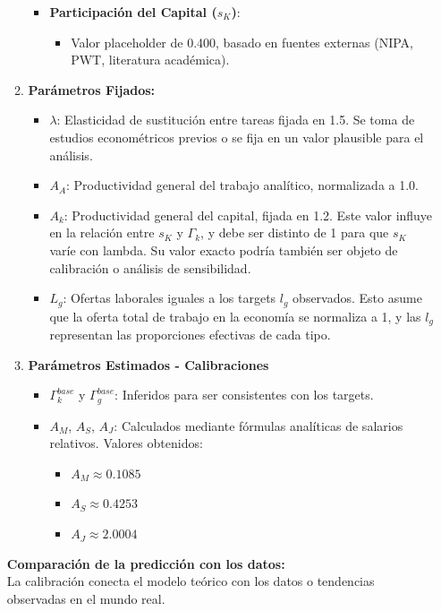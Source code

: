 \documentclass{article}
\theoremstyle{remark}
\theoremstyle{definition}
\begin{document}
\begin{enumerate}
\begin{tcolorbox}[title= Soluci\'on 6]
\begin{enumerate}
\begin{itemize}
        \item \textbf{Participación del Capital ($s_K$)}:
        \begin{itemize}
            \item Valor placeholder de 0.400, basado en fuentes externas (NIPA, PWT, literatura académica).
        \end{itemize}
    \end{itemize}

    \item \textbf{Parámetros Fijados:}
    \begin{itemize}
        \item $\lambda$: Elasticidad de sustitución entre tareas fijada en 1.5. Se toma de estudios econométricos previos o se fija en un valor plausible para el análisis.
        \item $A_A$: Productividad general del trabajo analítico, normalizada a 1.0.
        \item $A_k$: Productividad general del capital, fijada en 1.2. Este valor influye en la relación entre $s_K$ y $\Gamma_k$, y debe ser distinto de 1 para que $s_K$ varíe con lambda. Su valor exacto podría también ser objeto de calibración o análisis de sensibilidad.
        \item $L_g$: Ofertas laborales iguales a los targets $l_g$ observados. Esto asume que la oferta total de trabajo en la economía se normaliza a 1, y las $l_g$ representan las proporciones efectivas de cada tipo.
    \end{itemize}

    \item \textbf{Parámetros Estimados - Calibraciones}
    \begin{itemize}
        \item $\Gamma_k^{base}$ y $\Gamma_g^{base}$: Inferidos para ser consistentes con los targets.
        \item $A_M$, $A_S$, $A_J$: Calculados mediante fórmulas analíticas de salarios relativos. Valores obtenidos:
        \begin{itemize}
            \item $A_M \approx 0.1085$
            \item $A_S \approx 0.4253$
            \item $A_J \approx 2.0004$
        \end{itemize}
    \end{itemize}
\end{enumerate}

\textbf{Comparaci\'on de la predicci\'on con los datos:} \\
La calibración conecta el modelo teórico con los datos o tendencias observadas en el mundo real.


\end{tcolorbox}
\end{enumerate}
\end{document}
